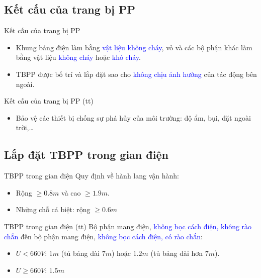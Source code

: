 \documentclass[20pt]{beamer}
\newcommand{\noibat}[1]{\textcolor{blue}{#1}} %
\begin{document}
\subsection*{Kết cấu của trang bị PP}
\begin{frame}{Kết cấu của trang bị PP}
	\begin{itemize}
	\justifying
		\item \alert{Khung bảng điện} làm bằng \noibat{vật liệu không cháy}, \alert{vỏ và các bộ phận khác} làm bằng vật liệu \noibat{không cháy} hoặc \noibat{khó cháy}.
		
		\item \alert{TBPP được bố trí và lắp đặt} sao cho \noibat{không chịu ảnh hưởng} của tác động bên ngoài.
	\end{itemize}
\end{frame}

\begin{frame}{Kết cấu của trang bị PP (tt)}
	\begin{itemize}
	\justifying
		\item \alert{Bảo vệ các thiết bị chống sự phá hủy của môi trường:} độ ẩm, bụi, đặt ngoài trời,\ldots
	\end{itemize}
\end{frame}


\subsection*{Lắp đặt TBPP trong gian điện}
\begin{frame}{TBPP trong gian điện}
\justifying
	Quy định về hành lang vận hành:
	\begin{itemize}
	\justifying
		\item Rộng $\geq 0.8m$ và cao $\geq 1.9m$.
		\item Những chỗ cá biệt: rộng $\geq 0.6m$	
	\end{itemize}
\end{frame}

\begin{frame}{TBPP trong gian điện (tt)}
\justifying
\alert{Bộ phận mang điện}, \noibat{không bọc cách điện, không rào chắn} đến \alert{bộ phận mang điện}, \noibat{không bọc cách điện, có rào chắn}:
	\begin{itemize}
	\justifying
		\item $U < 660V$: $1m$ (tủ bảng dài $7m$) hoặc $1.2m$ (tủ bảng dài hơn $7m$).
		
		\item $U \geq 660V$: $1.5m$
	\end{itemize}
\end{frame}
\end{document}
